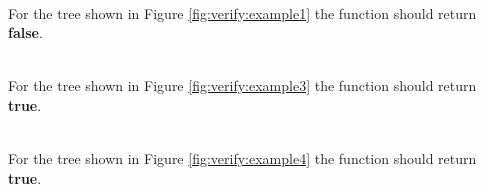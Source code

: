 \begin{example}
	\label{example:verify_BST:example1}
	\hfill \\
	For the tree shown in Figure \ref{fig:verify:example1} the function should return \textbf{false}.
	
\end{example}

\begin{example}
	\label{example:verify_BST:example3}
	\hfill \\
	For the tree shown in Figure \ref{fig:verify:example3} the function should return \textbf{true}.
	
\end{example}

\begin{example}
\label{example:verify_BST:example4}
	\hfill \\
	For the tree shown in Figure \ref{fig:verify:example4} the function should return \textbf{true}.

\end{example}


